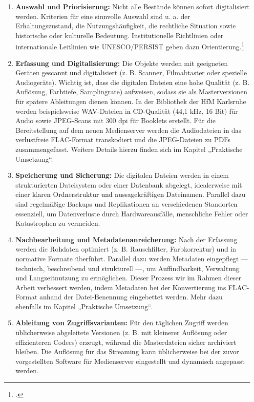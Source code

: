 \documentclass[12pt,a4paper]{report}
\begin{document}
  \begin{enumerate}
    \item \textbf{Auswahl und Priorisierung:}  
      Nicht alle Bestände können sofort digitalisiert werden. 
      Kriterien für eine sinnvolle Auswahl sind u. a. der Erhaltungszustand, die Nutzungshäufigkeit, die rechtliche Situation sowie historische oder kulturelle Bedeutung. Institutionelle Richtlinien oder internationale Leitlinien wie \ac{UNESCO}/\ac{PERSIST} geben dazu Orientierung.\footcite[Vgl.][]{unesco_persist_guidelines}  

    \item \textbf{Erfassung und Digitalisierung:}  
      Die Objekte werden mit geeigneten Geräten gescannt und digitalisiert (z. B. Scanner, Filmabtaster oder spezielle Audiogeräte). 
      Wichtig ist, dass die digitalen Dateien eine hohe Qualität (z. B. Auflösung, Farbtiefe, Samplingrate) aufweisen, 
      sodass sie als Masterversionen für spätere Ableitungen dienen können.  
      In der Bibliothek der \ac{HfM} Karlsruhe werden beispielsweise \ac{WAV}-Dateien in \ac{CD}-Qualität (44,1 kHz, 16 Bit) für Audio sowie JPEG-Scans mit 300 dpi für Booklets erstellt.  
      Für die Bereitstellung auf dem neuen Medienserver werden die Audiodateien in das verlustfreie \ac{FLAC}-Format transkodiert und die JPEG-Dateien zu \acp{PDF} zusammengefasst.  
      Weitere Details hierzu finden sich im Kapitel „Praktische Umsetzung“.  
    
    \item \textbf{Speicherung und Sicherung:}
      Die digitalen Dateien werden in einem strukturierten Dateisystem oder einer Datenbank abgelegt, 
      idealerweise mit einer klaren Ordnerstruktur und aussagekräftigen Dateinamen. 
      Parallel dazu sind regelmäßige Backups und Replikationen an verschiedenen Standorten essenziell, 
      um Datenverluste durch Hardwareausfälle, menschliche Fehler oder Katastrophen zu vermeiden.
  
    \item \textbf{Nachbearbeitung und Metadatenanreicherung:}  
      Nach der Erfassung werden die Rohdaten optimiert (z. B. Rauschfilter, Farbkorrektur) und in normative Formate überführt. 
      Parallel dazu werden Metadaten eingepflegt — technisch, beschreibend und strukturell —, um Auffindbarkeit, Verwaltung und Langzeitnutzung zu ermöglichen.
      Dieser Prozess wir im Rahmen dieser Arbeit verbessert werden, indem Metadaten bei der Konvertierung ins \ac{FLAC}-Format anhand der Datei-Benennung eingebettet werden.
      Mehr dazu ebenfalls im Kapitel „Praktische Umsetzung“.

    \item \textbf{Ableitung von Zugriffsvarianten:}  
      Für den täglichen Zugriff werden üblicherweise abgeleitete Versionen (z. B. mit kleinerer Auflösung oder effizienteren Codecs) erzeugt,
      während die Masterdateien sicher archiviert bleiben.
      Die Auflösung für das Streaming kann üblicherweise bei der zuvor vorgestellten Software für Medienserver eingestellt und dynamisch angepasst werden.
  \end{enumerate}  
\end{document}
